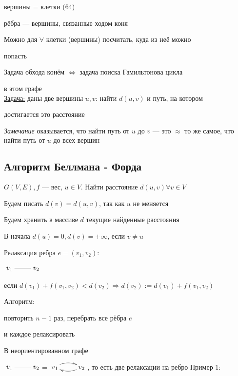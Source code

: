 \documentclass[a4paper, 12pt] {article}
\begin{document}
вершины = клетки (64)

рёбра --- вершины, связанные ходом коня

Можно для $ \forall $ клетки (вершины) посчитать, куда из неё можно 

попасть

Задача обхода конём $ \Leftrightarrow $ задача поиска Гамильтонова цикла 

в этом графе\\

\underline{Задача:} даны две вершины $ u, v $: найти $ d(u, v) $ и путь, на котором 

достигается это расстояние

\textit{Замечание} оказывается, что найти путь от $ u $ до $ v $ --- это $ \approx $ то же самое, что найти путь от  $ u $ до всех вершин

\subsection{Алгоритм Беллмана - Форда}

$ G(V, E), f $ --- вес, $ u \in V $. Найти расстояние $ d(u, v) \forall v \in V $

Будем писать $ d(v) = d(u, v)$, так как $ u $ не меняется

Будем хранить в массиве $ d $ текущие найденные расстояния

В начала $ d(u)=0, d(v) =+ \infty $, если $ v \ne u $

Релаксация ребра $ e = (v_{1}, v_{2}) $:

$ \begin{matrix}
	\xymatrix{
		v_{1} \ar@{-}[r]  & v_{2}  \\
	}
\end{matrix} $

если $ d(v_{1}) + f(v_{1}, v_{2}) < d(v_{2}) \Rightarrow d(v_{2}):=d(v_{1}) + f(v_{1}, v_{2})$

Алгоритм: 

повторить $ n-1 $ раз, перебрать все рёбра $ e $

 и каждое релаксировать

В неориентированном графе 

$ \begin{matrix}
	\xymatrix{
		v_{1} \ar@{-}[r]  & v_{2}  \\
	}
\end{matrix} $=
$ \begin{matrix}
	\xymatrix{
		v_{1} \ar@/^/[r]  & v_{2} \ar@/^/[l] \\
	}
\end{matrix} $, то есть две релаксации на ребро 
\newpage
Пример 1:
\end{document}
